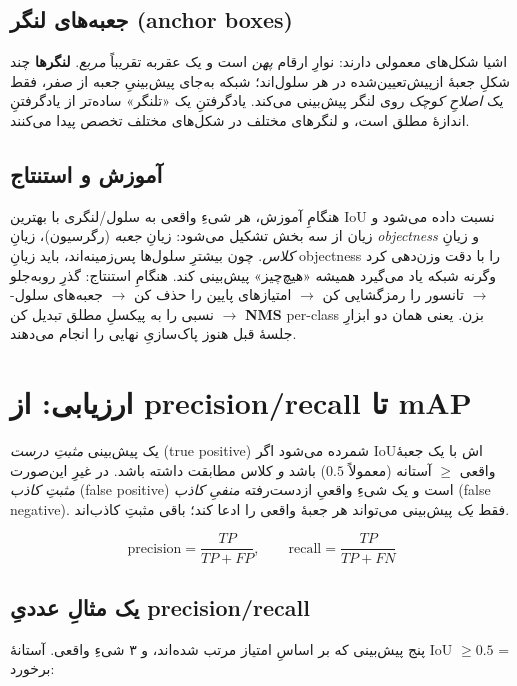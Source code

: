 \documentclass[12pt,a4paper]{article}
\begin{document}
\subsection{جعبه‌های لنگر (anchor boxes)}

اشیا شکل‌های معمولی دارند: نوارِ ارقام \emph{پهن} است و یک عقربه تقریباً \emph{مربع}. \textbf{لنگرها} چند شکلِ جعبهٔ ازپیش‌تعیین‌شده در هر سلول‌اند؛ شبکه به‌جای پیش‌بینیِ جعبه از صفر، فقط یک \emph{اصلاحِ کوچک} روی لنگر پیش‌بینی می‌کند. یادگرفتنِ یک «تلنگر» ساده‌تر از یادگرفتنِ اندازهٔ مطلق است، و لنگرهای مختلف در شکل‌های مختلف تخصص پیدا می‌کنند.

\subsection{آموزش و استنتاج}

هنگامِ آموزش، هر شیءِ واقعی به سلول/لنگری با بهترین IoU نسبت داده می‌شود و زیان از سه بخش تشکیل می‌شود: زیانِ \emph{جعبه} (رگرسیون)، زیانِ \emph{objectness} و زیانِ \emph{کلاس}. چون بیشترِ سلول‌ها پس‌زمینه‌اند، باید زیانِ objectness را با دقت وزن‌دهی کرد وگرنه شبکه یاد می‌گیرد همیشه «هیچ‌چیز» پیش‌بینی کند. هنگامِ استنتاج: گذرِ رو‌به‌جلو $\to$ تانسور را رمزگشایی کن $\to$ امتیازهای پایین را حذف کن $\to$ جعبه‌های سلول-نسبی را به پیکسلِ مطلق تبدیل کن $\to$ \textbf{NMS} per-class بزن. یعنی همان دو ابزارِ جلسهٔ قبل هنوز پاک‌سازیِ نهایی را انجام می‌دهند.

\section{ارزیابی: از precision/recall تا mAP}

یک پیش‌بینی \emph{مثبتِ درست} (true positive) شمرده می‌شود اگر IoUاش با یک جعبهٔ واقعی $\ge$ آستانه (معمولاً $0.5$) باشد \emph{و} کلاس مطابقت داشته باشد. در غیرِ این‌صورت \emph{مثبتِ کاذب} (false positive) است و یک شیءِ واقعیِ ازدست‌رفته \emph{منفیِ کاذب} (false negative). فقط \emph{یک} پیش‌بینی می‌تواند هر جعبهٔ واقعی را ادعا کند؛ باقی مثبتِ کاذب‌اند.

\begin{riyazi}
\[
\text{precision}=\frac{TP}{TP+FP}, \qquad \text{recall}=\frac{TP}{TP+FN}
\]
\end{riyazi}

\subsection{یک مثالِ عددیِ precision/recall}

پنج پیش‌بینی که بر اساسِ امتیاز مرتب شده‌اند، و ۳ شیءِ واقعی. آستانهٔ IoU $\ge0.5$ = برخورد:
\end{document}
